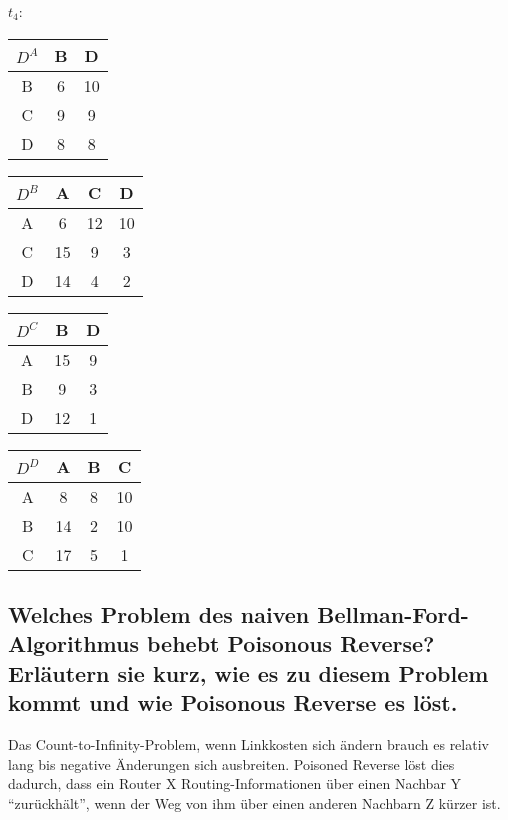 \documentclass[a4paper]{article}
\begin{document}
\paragraph{$t_4:$}
\begin{center}
  \begin{tabular}{|c|c|c|}
    \hline
    $D^A$ & B & D \\ \hline
    B & 6 & 10 \\ \hline
    C & 9 &  9\\ \hline
    D & 8 &8  \\
    \hline
  \end{tabular}
  \begin{tabular}{|c|c|c|c|}
    \hline
    $D^B$ & A & C & D \\ \hline
    A & 6 & 12 & 10  \\ \hline
    C & 15 &9 &  3\\ \hline
    D &  14&  4& 2 \\
    \hline
  \end{tabular}
  \begin{tabular}{|c|c|c|}
    \hline
    $D^C$ & B & D \\ \hline
    A &15 & 9 \\ \hline
    B & 9 & 3\\ \hline
    D &  12& 1 \\
    \hline
  \end{tabular}
  \begin{tabular}{|c|c|c|c|}
    \hline
    $D^D$ & A & B & C \\ \hline
    A & 8 & 8 & 10 \\ \hline
    B & 14 &2 & 10 \\ \hline
    C &  17 & 5 & 1 \\
    \hline
  \end{tabular}
\end{center}

\subsection{Welches Problem des naiven Bellman-Ford-Algorithmus behebt Poisonous Reverse? Erläutern sie kurz, wie es zu diesem Problem kommt und wie Poisonous Reverse es löst.}
Das Count-to-Infinity-Problem, wenn Linkkosten sich ändern brauch es relativ lang bis negative Änderungen sich ausbreiten.
Poisoned Reverse löst dies dadurch, dass ein Router X Routing-Informationen über einen Nachbar Y ``zurückhält'', wenn der Weg von ihm über einen anderen Nachbarn Z kürzer ist.
\end{document}
